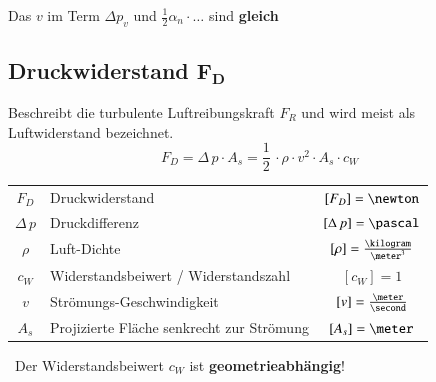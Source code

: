 Das $v$ im Term $\Delta p_v$ und $\frac{1}{2}\alpha_n \cdot \dots$ sind \textbf{gleich}

\subsection[Druckwiderstand]{Druckwiderstand $\bm{F_D}$}

Beschreibt die turbulente Luftreibungskraft $F_R$ und wird meist als Luftwiderstand bezeichnet.
$$ \boxed{ F_D = \Delta \, p \cdot A_s = \frac{1}{2} \, \cdot \rho \cdot v^2 \cdot A_s \cdot c_W } $$

\renewcommand{\arraystretch}{1.3}
\begin{tabular}{c l c}
    $F_D$           & Druckwiderstand                           & $[F_D] = \newton$                     \\
    $\Delta \, p$   & Druckdifferenz                            & $[\Delta \, p] = \pascal$             \\
    $\rho$          & Luft-Dichte                               & $[\rho] = \frac{\kilogram}{\meter^3}$ \\
    
$c_W$           & Widerstandsbeiwert / Widerstandszahl      & $[c_W] = 1$                           \\
    $v$             & Strömungs-Geschwindigkeit                 & $[v] = \frac{\meter}{\second}$        \\
    
$A_s$           & Projizierte Fläche senkrecht zur Strömung & $[A_s] = \meter$
\end{tabular}
\renewcommand{\arraystretch}{1}

\medskip

\textrightarrow\ Der Widerstandsbeiwert $c_W$ ist \textbf{geometrieabhängig}!
